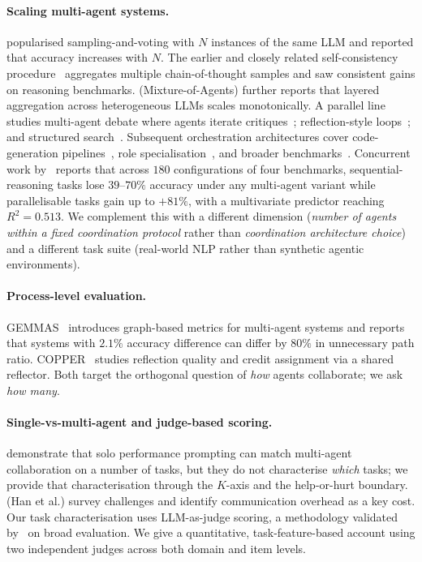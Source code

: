 \documentclass{article}
\begin{document}
\paragraph{Scaling multi-agent systems.} \citet{li2024moreagents} popularised sampling-and-voting with $N$ instances of the same LLM and reported that accuracy increases with $N$. The earlier and closely related self-consistency procedure~\citep{wang2023selfconsistency} aggregates multiple chain-of-thought samples and saw consistent gains on reasoning benchmarks. \citet{wang2024moa} (Mixture-of-Agents) further reports that layered aggregation across heterogeneous LLMs scales monotonically. A parallel line studies multi-agent debate where agents iterate critiques~\citep{du2023multiagentdebate,liang2023divergent}; reflection-style loops~\citep{shinn2023reflexion}; and structured search~\citep{yao2023tot}. Subsequent orchestration architectures cover code-generation pipelines~\citep{qian2023chatdev}, role specialisation~\citep{wu2023autogen,hong2023metagpt}, and broader benchmarks~\citep{liu2023agentbench}. Concurrent work by~\citet{google2025scalingagents} reports that across $180$ configurations of four benchmarks, sequential-reasoning tasks lose $39$--$70\%$ accuracy under any multi-agent variant while parallelisable tasks gain up to $+81\%$, with a multivariate predictor reaching $R^{2}{=}0.513$. We complement this with a different dimension (\emph{number of agents within a fixed coordination protocol} rather than \emph{coordination architecture choice}) and a different task suite (real-world NLP rather than synthetic agentic environments).

\paragraph{Process-level evaluation.} GEMMAS~\citep{lee2025gemmas} introduces graph-based metrics for multi-agent systems and reports that systems with $2.1\%$ accuracy difference can differ by $80\%$ in unnecessary path ratio. COPPER~\citep{wang2024copper} studies reflection quality and credit assignment via a shared reflector. Both target the orthogonal question of \emph{how} agents collaborate; we ask \emph{how many}.

\paragraph{Single-vs-multi-agent and judge-based scoring.} \citet{wang2023solo} demonstrate that solo performance prompting can match multi-agent collaboration on a number of tasks, but they do not characterise \emph{which} tasks; we provide that characterisation through the $K$-axis and the help-or-hurt boundary. \citet{liu2023llm-mas-survey} (Han et al.) survey challenges and identify communication overhead as a key cost. Our task characterisation uses LLM-as-judge scoring, a methodology validated by~\citet{zheng2023llmjudge} on broad evaluation. We give a quantitative, task-feature-based account using two independent judges across both domain and item levels.
\end{document}

